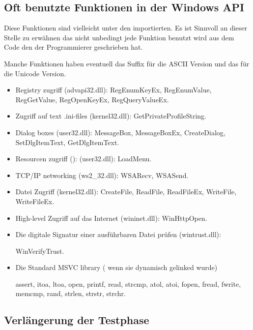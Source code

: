 \subsection{Oft benutzte Funktionen in der Windows API}

Diese Funktionen sind vielleicht unter den importierten.
Es ist Sinnvoll an dieser Stelle zu erw\"ahnen das nicht unbedingt jede Funktion benutzt wird aus 
dem Code den der Programmierer geschrieben hat.

Manche Funktionen haben eventuell das  Suffix f\"ur die ASCII Version und das  f\"ur die Unicode Version.


\begin{itemize}

\item
Registry zugriff (advapi32.dll): 
RegEnumKeyEx, RegEnumValue, RegGetValue, RegOpenKeyEx, RegQueryValueEx.

\item
Zugriff auf text .ini-files (kernel32.dll): 
GetPrivateProfileString.

\item
Dialog boxes (user32.dll): 
MessageBox, MessageBoxEx, CreateDialog, SetDlgItemText, GetDlgItemText.

\item
Resourcen zugriff (): (user32.dll): LoadMenu.

\item
TCP/IP networking (ws2\_32.dll):
WSARecv, WSASend.

\item
Datei Zugriff (kernel32.dll):
CreateFile, ReadFile, ReadFileEx, WriteFile, WriteFileEx.

\item
High-level Zugriff auf das Internet (wininet.dll): WinHttpOpen.

\item
Die digitale Signatur einer ausf\"uhrbaren Datei pr\"ufen (wintrust.dll):

WinVerifyTrust.

\item
Die Standard MSVC library ( wenn sie dynamisch gelinked wurde) 

assert, itoa, ltoa, open, printf, read, strcmp, atol, atoi, fopen, fread, fwrite, memcmp, rand,
strlen, strstr, strchr.

\end{itemize}

\subsection{Verl\"angerung der Testphase}

